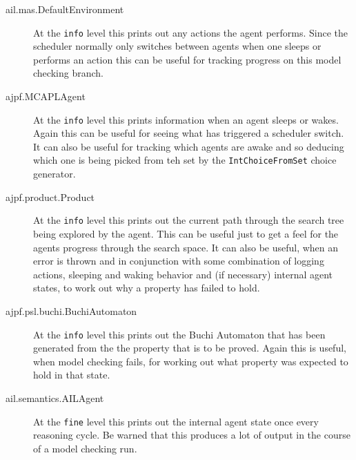\documentclass[a4]{article}
\begin{document}
\begin{description}
\item[ail.mas.DefaultEnvironment] At the \texttt{info} level this prints out any actions the agent performs.  Since the scheduler normally only switches between agents when one sleeps or performs an action this can be useful for tracking progress on this model checking branch.
\item[ajpf.MCAPLAgent] At the \texttt{info} level this prints information when an agent sleeps or wakes.  Again this can be useful for seeing what has triggered a scheduler switch.  It can also be useful for tracking which agents are awake and so deducing which one is being picked from teh set by the \texttt{IntChoiceFromSet} choice generator.
\item[ajpf.product.Product] At the \texttt{info} level this prints out the current path through the search tree being explored by the agent.  This can be useful just to get a feel for the agents progress through the search space.  It can also be useful, when an error is thrown and in conjunction with some combination of logging actions, sleeping and waking behavior and (if necessary) internal agent states, to work out why a property has failed to hold.
\item[ajpf.psl.buchi.BuchiAutomaton] At the \texttt{info} level this prints out the Buchi Automaton that has been generated from the the property that is to be proved.  Again this is useful, when model checking fails, for working out what property was expected to hold in that state.
\item[ail.semantics.AILAgent] At the \texttt{fine} level this prints out the internal agent state once every reasoning cycle.  Be warned that this produces a lot of output in the course of a model checking run.
\end{description}
\end{document}
